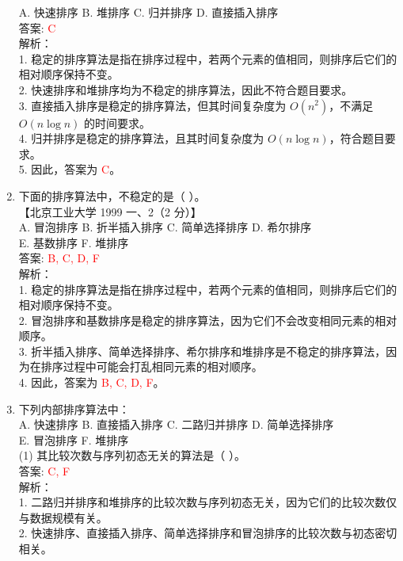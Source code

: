 \documentclass[lang=cn,newtx,10pt,scheme=chinese]{../../../elegantbook}
\begin{document}
\begin{enumerate}
    A. 快速排序 \quad B. 堆排序 \quad C. 归并排序 \quad D. 直接插入排序 \\

    答案: \textcolor{red}{C} \\

    解析：\\
    1. 稳定的排序算法是指在排序过程中，若两个元素的值相同，则排序后它们的相对顺序保持不变。\\
    2. 快速排序和堆排序均为不稳定的排序算法，因此不符合题目要求。\\
    3. 直接插入排序是稳定的排序算法，但其时间复杂度为 $O(n^2)$，不满足 $O(n \log n)$ 的时间要求。\\
    4. 归并排序是稳定的排序算法，且其时间复杂度为 $O(n \log n)$，符合题目要求。\\
    5. 因此，答案为 \textcolor{red}{C}。\\  

    \item 下面的排序算法中，不稳定的是（ ）。\\
    【北京工业大学 1999 一、2（2 分）】\\

    A. 冒泡排序 \quad B. 折半插入排序 \quad C. 简单选择排序 \quad D. 希尔排序 \\  
    E. 基数排序 \quad F. 堆排序 \\

    答案: \textcolor{red}{B, C, D, F} \\

    解析：\\
    1. 稳定的排序算法是指在排序过程中，若两个元素的值相同，则排序后它们的相对顺序保持不变。\\
    2. 冒泡排序和基数排序是稳定的排序算法，因为它们不会改变相同元素的相对顺序。\\
    3. 折半插入排序、简单选择排序、希尔排序和堆排序是不稳定的排序算法，因为在排序过程中可能会打乱相同元素的相对顺序。\\
    4. 因此，答案为 \textcolor{red}{B, C, D, F}。\\

    \item 下列内部排序算法中：\\
    A. 快速排序 \quad B. 直接插入排序 \quad C. 二路归并排序 \quad D. 简单选择排序 \\  
    E. 冒泡排序 \quad F. 堆排序 \\

    (1) 其比较次数与序列初态无关的算法是（ ）。 \\  
    答案: \textcolor{red}{C, F} \\  
    解析：\\
    1. 二路归并排序和堆排序的比较次数与序列初态无关，因为它们的比较次数仅与数据规模有关。\\
    2. 快速排序、直接插入排序、简单选择排序和冒泡排序的比较次数与初态密切相关。\\


\end{enumerate}
\end{document}
